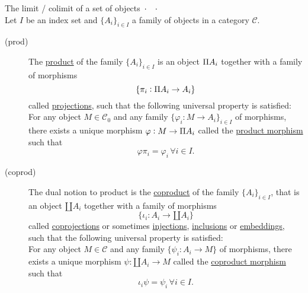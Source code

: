 \begin{definition}\label{def:prod_coprod}
The limit / colimit of a set of objects $\,\cdot \text{\phantom{$\rightarrow$}} \cdot$\\
Let $I$ be an index set and $\{A_{i}\}_{i\in I}$ a family of objects in a category $\mathcal{C}$.
\begin{description}
\item[(prod)] The \ul{product} of the family $\{A_{i}\}_{i\in I}$ is an object $\invamalg A_{i}$ together with a family of morphisms
\[
\{ \pi_{i} : \invamalg A_{i} \rightarrow A_{i} \}
\]
called \ul{projections}, such that the following universal property is satisfied:\\
For any object $M \in \mathcal{C}_{0}$ and any family $\{ \varphi_{i} : M \rightarrow A_{i} \}_{i\in I}$ of morphisms, there exists
a unique morphism $\varphi : M \rightarrow \invamalg A_{i}$ called the \ul{product morphism} such that
\[
\varphi \pi_{i} = \varphi_{i} \, \forall i \in I.
\]
\item[(coprod)] The dual notion to product is the \ul{coproduct} of the family $\{A_{i}\}_{i\in I}$, that is an object $\amalg A_{i}$ together with
a family of morphisms
\[
\{ \iota_{i} : A_{i} \rightarrow \amalg A_{i} \}
\]
called \ul{coprojections} or sometimes \ul{injections}, \ul{inclusions} or \ul{embeddings}, such that the following universal property is satisfied:\\
For any object $M \in \mathcal{C}$ and any family $\{ \psi_{i} : A_{i} \rightarrow M \}$ of morphisms, there exists a unique
morphism $\psi : \amalg A_{i} \rightarrow M$ called the \ul{coproduct morphism} such that
\[
\iota_{i} \psi = \psi_{i} \, \forall i \in I.
\]
\end{description}
\end{definition}

